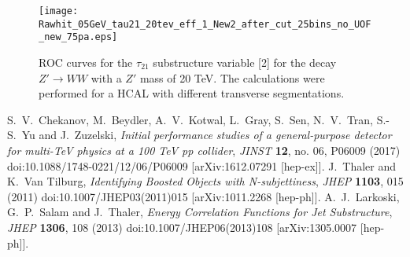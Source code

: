 \documentclass[a4paper]{PoS}
\begin{document}
 \begin{figure}
 \begin{center}
   \begin{minipage}[c]{0.4\textwidth}
     \texttt{[image: Rawhit\_05GeV\_tau21\_20tev\_eff\_1\_New2\_after\_cut\_25bins\_no\_UOF\_new\_75pa.eps]}
   \end{minipage}\hfill
   \begin{minipage}[c]{0.4\textwidth}
     \caption{
        ROC curves for the $\tau_{21}$ substructure variable [2] for the decay $Z'\rightarrow WW$ with a $Z'$ mass of 20 TeV. The calculations were performed for a HCAL with 
different transverse segmentations.
     } \label{1}
   \end{minipage}
    \end{center}
\end{figure}


\begin{thebibliography}{99}
  S.~V.~Chekanov, M.~Beydler, A.~V.~Kotwal, L.~Gray, S.~Sen, N.~V.~Tran, S.-S.~Yu and J.~Zuzelski,
  \emph{Initial performance studies of a general-purpose detector for multi-TeV physics at a 100 TeV pp collider},
  \emph{JINST} {\bf 12}, no. 06, P06009 (2017)
  doi:10.1088/1748-0221/12/06/P06009
  [arXiv:1612.07291 [hep-ex]].
  J.~Thaler and K.~Van Tilburg,
  \emph{Identifying Boosted Objects with N-subjettiness},
  \emph{JHEP} {\bf 1103}, 015 (2011)
  doi:10.1007/JHEP03(2011)015
  [arXiv:1011.2268 [hep-ph]].
  A.~J.~Larkoski, G.~P.~Salam and J.~Thaler,
  \emph{Energy Correlation Functions for Jet Substructure},
  \emph{JHEP} {\bf 1306}, 108 (2013)
  doi:10.1007/JHEP06(2013)108
  [arXiv:1305.0007 [hep-ph]].
\end{thebibliography}
\end{document}
